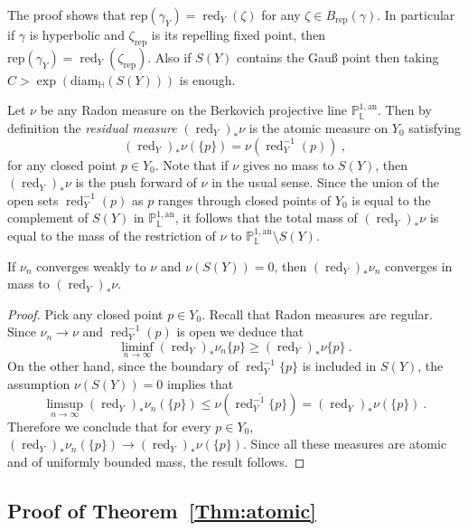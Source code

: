 \documentclass[AHL,Unicode,longabstracts]{cedram}
\DeclareMathOperator{\red}{red}
\newcommand{\an}{\mathrm{an}}
\newcommand{\PP}{\mathbb{P}}
\newcommand{\Laurent}{\mathbb{L}}
\newcommand{\rep}{\mathrm{rep}}
\begin{document}
\begin{rema}\label{rem:more precise}
The proof shows that $\mathrm{rep}(\gamma_Y) = \red_Y (\zeta)$ for any $\zeta \in B_{\rep}(\gamma)$. In particular if $\gamma$ is hyperbolic and $\zeta_{\mathrm{rep}}$ is its repelling fixed point, then $\mathrm{rep}(\gamma_Y) = \red_Y (\zeta_{\mathrm{rep}})$. Also if $S(Y)$ contains the Gau{\ss} point then taking $C > \exp (\mathrm{diam}_\mathbb{H} (S(Y)))$ is enough.
\end{rema}

Let $\nu$ be any Radon measure on the Berkovich projective line $\PP^{1,\an}_{\Laurent}$. Then by definition the \emph{residual measure} $(\red_Y)_* \nu$ is the atomic measure on $Y_0$ satisfying
\[
{(\red_Y)_* \nu} (\{ p \}) = \nu (\red_Y^{-1}(p))~,
\]
for any closed point $p\in Y_0$. Note that if $\nu$ gives no mass to $S(Y)$, then $(\red_Y)_* \nu$ is the push forward of $\nu$ in the usual sense. Since the union of the open sets $\red_Y^{-1}(p)$ as $p$ ranges through closed points of $Y_0$ is equal to the complement of $S(Y)$ in $\PP^{1,\an}_{\Laurent}$, it follows that the total mass of $(\red_Y)_* \nu$ is equal to the mass of the restriction of $\nu$ to $\PP^{1,\an}_{\Laurent}\setminus S(Y)$.

\begin{lemm}\label{lem:cvg mass}
If $\nu_n$ converges weakly to $\nu$ and $\nu(S(Y)) =0$, then $(\red_Y)_* \nu_n$ converges in mass to $(\red_Y)_* \nu$.
\end{lemm}

\begin{proof}
Pick any closed point $p\in Y_0$. Recall that Radon measures are regular. Since $\nu_n \to \nu$ and $\red_Y^{-1}(p)$ is open we deduce that
\[
\liminf_{n\to\infty} (\red_Y)_* \nu_n \{ p \} \ge (\red_Y)_* \nu \{ p \}~.
\]
On the other hand, since the boundary of $\red_Y^{-1} \{ p \}$ is included in $S(Y)$, the assumption $\nu(S(Y)) =0$ implies that
\[
\limsup_{n\to\infty} (\red_Y)_* \nu_n (\{ p \}) \le \nu \left(\overline{ \red_Y^{-1} \{ p \}} \right) = (\red_Y)_* \nu (\{ p \})~.
\]
Therefore we conclude that for every $p\in Y_0$, $(\red_Y)_* \nu_n(\{p \}) \to (\red_Y)_* \nu (\{p\})$. Since all these measures are atomic and of uniformly bounded mass, the result follows.
\end{proof}

\subsection{Proof of Theorem~\ref{Thm:atomic}}\label{subs:atomic}
\end{document}
